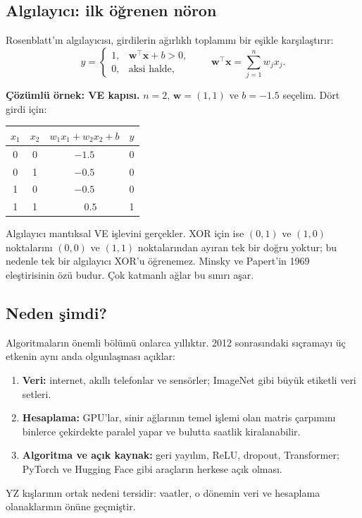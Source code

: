 \documentclass[11pt,a4paper]{article}
\begin{document}
\subsection{Algılayıcı: ilk öğrenen nöron}
Rosenblatt'ın algılayıcısı, girdilerin ağırlıklı toplamını bir eşikle karşılaştırır:
\begin{equation}
y = \begin{cases} 1, & \mathbf{w}^{\top}\mathbf{x} + b > 0,\\ 0, & \text{aksi halde,}\end{cases}
\qquad \mathbf{w}^{\top}\mathbf{x} = \sum_{j=1}^{n} w_j x_j .
\label{eq:perceptron}
\end{equation}

\begin{kutu}
\textbf{Çözümlü örnek: VE kapısı.} $n=2$, $\mathbf{w}=(1,1)$ ve $b=-1.5$ seçelim. Dört girdi için:
\begin{center}
\begin{tabular}{cc|c|c}
$x_1$ & $x_2$ & $w_1x_1+w_2x_2+b$ & $y$ \\ \hline
0 & 0 & $-1.5$ & 0 \\
0 & 1 & $-0.5$ & 0 \\
1 & 0 & $-0.5$ & 0 \\
1 & 1 & $\phantom{-}0.5$ & 1
\end{tabular}
\end{center}
Algılayıcı mantıksal VE işlevini gerçekler. XOR için ise $(0,1)$ ve $(1,0)$ noktalarını $(0,0)$ ve $(1,1)$ noktalarından ayıran tek bir doğru yoktur; bu nedenle tek bir algılayıcı XOR'u öğrenemez. Minsky ve Papert'in 1969 eleştirisinin özü budur. Çok katmanlı ağlar bu sınırı aşar.
\end{kutu}

\subsection{Neden şimdi?}
Algoritmaların önemli bölümü onlarca yıllıktır. 2012 sonrasındaki sıçramayı üç etkenin aynı anda olgunlaşması açıklar:
\begin{enumerate}
  \item \textbf{Veri:} internet, akıllı telefonlar ve sensörler; ImageNet gibi büyük etiketli veri setleri.
  \item \textbf{Hesaplama:} GPU'lar, sinir ağlarının temel işlemi olan matris çarpımını binlerce çekirdekte paralel yapar ve bulutta saatlik kiralanabilir.
  \item \textbf{Algoritma ve açık kaynak:} geri yayılım, ReLU, dropout, Transformer; PyTorch ve Hugging Face gibi araçların herkese açık olması.
\end{enumerate}
YZ kışlarının ortak nedeni tersidir: vaatler, o dönemin veri ve hesaplama olanaklarının önüne geçmiştir.
\end{document}
